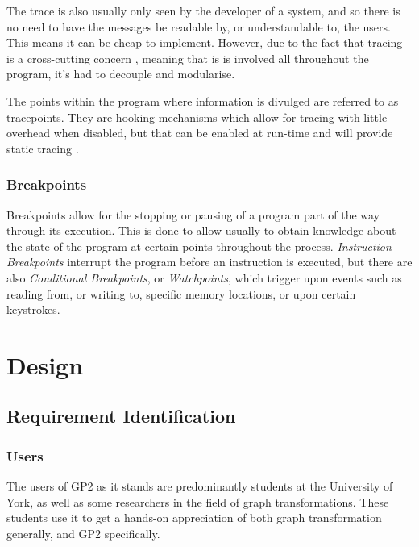 \documentclass{UoYCSproject}
\begin{document}
The trace is also usually only seen by the developer of a system, and so there is no need to have the messages be readable by, or understandable to, the users. This means it can be cheap to implement. However, due to the fact that tracing is a cross-cutting concern \cite{}, meaning that is is involved all throughout the program, it's had to decouple and modularise. %

The points within the program where information is divulged are referred to as tracepoints. They are hooking mechanisms which allow for tracing with little overhead when disabled, but that can be enabled at run-time and will provide static tracing \cite{tracing_book}.

\subsection{Breakpoints}
Breakpoints allow for the stopping or pausing of a program part of the way through its execution. This is done to allow usually to obtain knowledge about the state of the program at certain points throughout the process. \emph{Instruction Breakpoints} interrupt the program before an instruction is executed, but there are also \emph{Conditional Breakpoints}, or \emph{Watchpoints}, which trigger upon events such as reading from, or writing to, specific memory locations, or upon certain keystrokes.




\chapter{Design}
\section{Requirement Identification}

\subsection{Users}
The users of GP2 as it stands are predominantly students at the University of York, as well as some researchers in the field of graph transformations. These students use it to get a hands-on appreciation of both graph transformation generally, and GP2 specifically.
\end{document}
